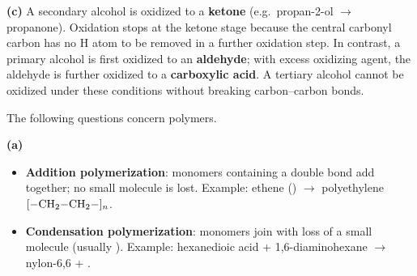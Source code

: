 \documentclass[addpoints]{exam}
\begin{document}
\begin{questions}
\begin{solution}[10cm]
\textbf{(c)} A secondary alcohol is oxidized to a \textbf{ketone} (e.g.\ propan-2-ol
$\rightarrow$ propanone). Oxidation stops at the ketone stage because the central carbonyl carbon
has no H atom to be removed in a further oxidation step. In contrast, a primary alcohol is
first oxidized to an \textbf{aldehyde}; with excess oxidizing agent, the aldehyde is further
oxidized to a \textbf{carboxylic acid}. A tertiary alcohol cannot be oxidized under these conditions
without breaking carbon--carbon bonds.
\end{solution}

\question The following questions concern polymers.
\begin{solution}[9cm]
\textbf{(a)}
\begin{itemize}
    \item \textbf{Addition polymerization}: monomers containing a  double bond add
    together; no small molecule is lost. Example: ethene () $\rightarrow$
    polyethylene $[\ce{-CH2-CH2-}]_n$.
    \item \textbf{Condensation polymerization}: monomers join with loss of a small molecule
    (usually ). Example: hexanedioic acid + 1,6-diaminohexane $\rightarrow$
    nylon-6,6 + .
\end{itemize}


\end{solution}
\end{questions}
\end{document}
